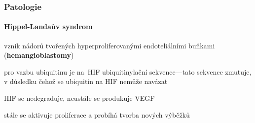 \documentclass[DIV=8]{scrreprt}
\begin{document}
\subsubsection{Patologie} \label{Patologie}


\paragraph{Hippel-Landaův syndrom}
\begin{myItemize}[nosep]
    \item vznik nádorů tvořených hyperproliferovanými endoteliálními buňkami (\textbf{hemangioblastomy})
    \item pro vazbu ubiquitinu je na HIF ubiquitinylační sekvence---tato sekvence zmutuje, v důsledku čehož se ubiquitin na HIF nemůže navázat
\begin{myItemize}[nosep]
    \item HIF se nedegraduje, neustále se produkuje VEGF
    \item stále se aktivuje proliferace a probíhá tvorba nových výběžků
\end{myItemize}

\end{myItemize}
\end{document}
